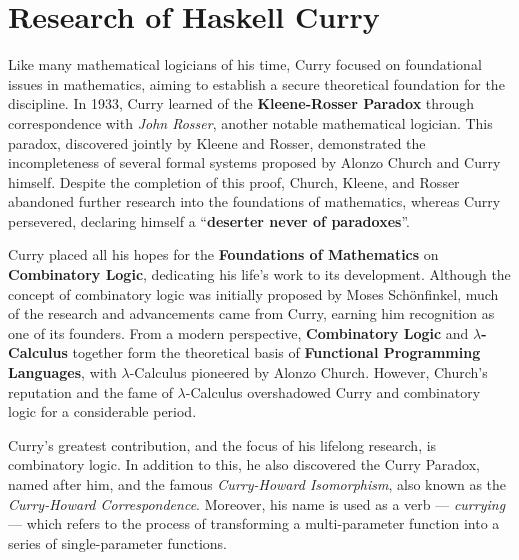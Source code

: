 \section{Research of Haskell Curry}

Like many mathematical logicians of his time, Curry focused on foundational issues in mathematics, aiming to establish a secure theoretical foundation for the discipline. In 1933, Curry learned of the \textbf{Kleene-Rosser Paradox}\cite{kleene-rosser-paradox} through correspondence with \textit{John Rosser}\cite{j-barkley-rosser}, another notable mathematical logician. This paradox, discovered jointly by Kleene and Rosser, demonstrated the incompleteness of several formal systems proposed by Alonzo Church and Curry himself. Despite the completion of this proof, Church, Kleene, and Rosser abandoned further research into the foundations of mathematics, whereas Curry persevered, declaring himself a ``\textbf{deserter never of paradoxes}''.

Curry placed all his hopes for the \textbf{Foundations of Mathematics} on \textbf{Combinatory Logic}, dedicating his life's work to its development. 
Although the concept of combinatory logic was initially proposed by Moses Schönfinkel, much of the research and advancements came from Curry, earning him recognition as one of its founders. 
From a modern perspective, \textbf{Combinatory Logic} and $\lambda$\textbf{-Calculus}\cite{lambda-calculus} together form the theoretical basis of \textbf{Functional Programming Languages}, with $\lambda$-Calculus pioneered by Alonzo Church\cite{alonzo-church}. 
However, Church's reputation and the fame of $\lambda$-Calculus overshadowed Curry and combinatory logic for a considerable period.

Curry's greatest contribution, and the focus of his lifelong research, is combinatory logic. In addition to this, he also discovered the Curry Paradox, named after him, and the famous \textit{Curry-Howard Isomorphism}, also known as the \textit{Curry-Howard Correspondence}. Moreover, his name is used as a verb — \textit{currying} — which refers to the process of transforming a multi-parameter function into a series of single-parameter functions.